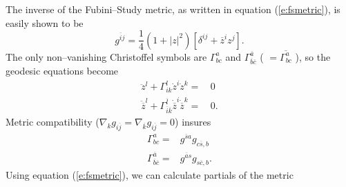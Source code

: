 The inverse of the Fubini--Study metric, as written in
equation (\ref{e:fsmetric}), is easily shown to be
\begin{equation}
g^{\overline{i}j} = \frac{1}{4}\left( 
                    1+\left| z\right|^2 
                \right) \left[
                    \delta^{ij} + \overline{z}^iz^j
                \right].
\label{e:fsinvmetric}
\end{equation}
The only non--vanishing Christoffel symbols are $\Gamma^a_{bc}$ and
$\Gamma^{\overline{a}}_{\overline{b}\overline{c}}$ ( $=\overline{\Gamma^a_{bc}}$ ), 
so the geodesic equations become
\begin{equation}
\begin{split}
    \ddot{z}^l + \Gamma^l_{ik}\dot{z}^i\dot{z}^k =&\, 0\\
    \ddot{\overline{z}}^l + \Gamma^{\overline{l}}_{\overline{i}\overline{k}}
            \dot{\overline{z}}^i\dot{\overline{z}}^k =&\, 0.
\end{split}
\label{e:geodesics}
\end{equation}
Metric compatibility ($\nabla_kg_{i\overline{j}} = \nabla_{\overline{k}}
g_{i\overline{j}} = 0$) insures
\begin{equation}
\begin{split}
    \Gamma^a_{bc} =& g^{\overline{s}a} g_{c\overline{s},b}\\
    \Gamma^{\overline{a}}_{\overline{b}\overline{c}} =& g^{\overline{a}s} 
                            g_{s\overline{c},b}.
\end{split}
\label{e:xsymb}
\end{equation}
Using equation (\ref{e:fsmetric}), we can calculate partials of the metric 
